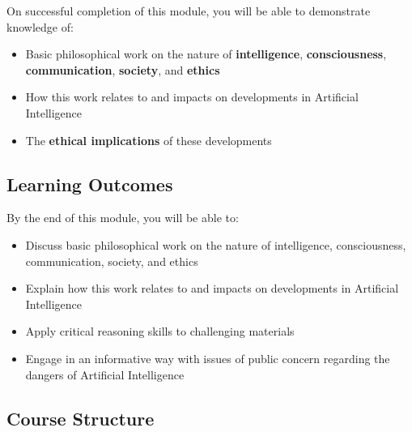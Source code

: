 On successful completion of this module, you will be able to demonstrate knowledge of:
\begin{itemize}
  \item Basic philosophical work on the nature of \textbf{intelligence}, \textbf{consciousness}, \textbf{communication}, \textbf{society}, and \textbf{ethics}
  \item How this work relates to and impacts on developments in Artificial Intelligence
  \item The \textbf{ethical implications} of these developments
\end{itemize}

\separator

\subsection*{Learning Outcomes}

By the end of this module, you will be able to:

\begin{itemize}
  \item[\textbf{PEA1:}] Discuss basic philosophical work on the nature of intelligence, consciousness, communication, society, and ethics
  \item[\textbf{PEA2:}] Explain how this work relates to and impacts on developments in Artificial Intelligence
  \item[\textbf{PEA3:}] Apply critical reasoning skills to challenging materials
  \item[\textbf{PEA4:}] Engage in an informative way with issues of public concern regarding the dangers of Artificial Intelligence
\end{itemize}

\separator

\subsection*{Course Structure}

